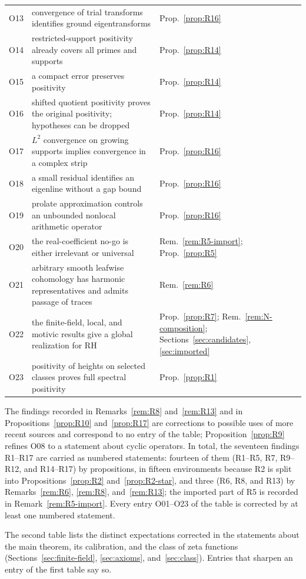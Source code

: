 \documentclass[11pt]{amsart}
\theoremstyle{plain}
\theoremstyle{definition}
\theoremstyle{remark}
\numberwithin{equation}{section}
\begin{document}
\begin{longtable}{@{}l>{\raggedright\arraybackslash}p{}
>{\raggedright\arraybackslash}p{}@{}}
O13 & convergence of trial transforms identifies ground eigentransforms
  & Prop.~\ref{prop:R16}\\
O14 & restricted-support positivity already covers all primes and
  supports & Prop.~\ref{prop:R14}\\
O15 & a compact error preserves positivity & Prop.~\ref{prop:R14}\\
O16 & shifted quotient positivity proves the original positivity;
  hypotheses can be dropped & Prop.~\ref{prop:R14}\\
O17 & $L^2$ convergence on growing supports implies convergence in a
  complex strip & Prop.~\ref{prop:R16}\\
O18 & a small residual identifies an eigenline without a gap bound &
  Prop.~\ref{prop:R16}\\
O19 & prolate approximation controls an unbounded nonlocal arithmetic
  operator & Prop.~\ref{prop:R16}\\
O20 & the real-coefficient no-go is either irrelevant or universal &
  Rem.~\ref{rem:R5-import}; Prop.~\ref{prop:R5}\\
O21 & arbitrary smooth leafwise cohomology has harmonic representatives
  and admits passage of traces & Rem.~\ref{rem:R6}\\
O22 & the finite-field, local, and motivic results give a global
  realization for RH & Prop.~\ref{prop:R7};
  Rem.~\ref{rem:N-composition}; Sections~\ref{sec:candidates},
  \ref{sec:imported}\\
O23 & positivity of heights on selected classes proves full spectral
  positivity & Prop.~\ref{prop:R1}\\
\end{longtable}

The findings recorded in Remarks~\ref{rem:R8} and~\ref{rem:R13} and in
Propositions~\ref{prop:R10} and~\ref{prop:R17} are corrections to
possible uses of more recent sources and correspond to no entry of the
table; Proposition~\ref{prop:R9} refines O08 to a statement about
cyclic operators. In total, the seventeen findings R1--R17 are carried
as numbered statements: fourteen of them (R1--R5, R7, R9--R12, and
R14--R17) by propositions, in fifteen environments because R2 is split
into Propositions~\ref{prop:R2} and~\ref{prop:R2-star}, and three (R6,
R8, and R13) by Remarks~\ref{rem:R6}, \ref{rem:R8}, and~\ref{rem:R13};
the imported part of R5 is recorded in Remark~\ref{rem:R5-import}.
Every entry O01--O23 of the table is corrected by at least one numbered
statement.

The second table lists the distinct expectations corrected in the
statements about the main theorem, its calibration, and the class of
zeta functions (Sections~\ref{sec:finite-field}, \ref{sec:axioms},
and~\ref{sec:class}). Entries that sharpen an entry of the first table
say so.
\end{document}
